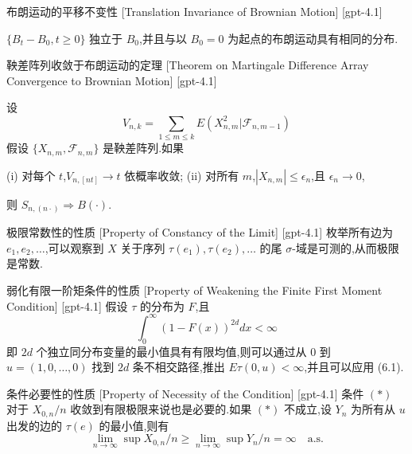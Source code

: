 \documentclass[UTF8]{ctexart}
\begin{document}
    
    
    \begin{ppt}
        {布朗运动的平移不变性}
        [Translation Invariance of Brownian Motion]
        [gpt-4.1]
        
$\{B_t - B_0, t \geq 0\}$ 独立于 $B_0$,并且与以 $B_0 = 0$ 为起点的布朗运动具有相同的分布.

    \end{ppt}
    
    
    
    \begin{thm}
        {鞅差阵列收敛于布朗运动的定理}
        [Theorem on Martingale Difference Array Convergence to Brownian Motion]
        [gpt-4.1]
        
设
\[
V_{n, k} = \sum_{1 \leq m \leq k} E(X_{n, m}^2 | \mathcal{F}_{n, m-1})
\]
假设 $\{ X_{n, m}, \mathcal{F}_{n, m} \}$ 是鞅差阵列.如果

(i) 对每个 $t$,$V_{n, [nt]} \to t$ 依概率收敛;
(ii) 对所有 $m$,$|X_{n, m}| \leq \epsilon_n$,且 $\epsilon_n \to 0$,

则 $S_{n, (n \cdot)} \Rightarrow B(\cdot)$.

    \end{thm}
    
    
    
    \begin{ppt}
        {极限常数性的性质}
        [Property of Constancy of the Limit]
        [gpt-4.1]
        枚举所有边为 $e_1, e_2, \ldots$,可以观察到 $X$ 关于序列 $\tau(e_1), \tau(e_2), \ldots$ 的尾 $\sigma$-域是可测的,从而极限是常数.
    \end{ppt}
    
    
    
    \begin{ppt}
        {弱化有限一阶矩条件的性质}
        [Property of Weakening the Finite First Moment Condition]
        [gpt-4.1]
        假设 $\tau$ 的分布为 $F$,且
\[
\int_{0}^{\infty} (1 - F(x))^{2d} dx < \infty
\]
即 $2d$ 个独立同分布变量的最小值具有有限均值,则可以通过从 $0$ 到 $u = (1, 0, \ldots, 0)$ 找到 $2d$ 条不相交路径,推出 $E\tau(0, u) < \infty$,并且可以应用 (6.1).
    \end{ppt}
    
    
    
    \begin{ppt}
        {条件必要性的性质}
        [Property of Necessity of the Condition]
        [gpt-4.1]
        条件 $(*)$ 对于 $X_{0, n} / n$ 收敛到有限极限来说也是必要的.如果 $(*)$ 不成立,设 $Y_n$ 为所有从 $
u$ 出发的边的 $\tau(e)$ 的最小值,则有
\[
\operatorname*{lim}_{n \to \infty} \operatorname*{sup} X_{0, n} / n \geq \operatorname*{lim}_{n \to \infty} \operatorname*{sup} Y_n / n = \infty \quad \mathrm{a.s.}
\]
    \end{ppt}
    
\end{document}
